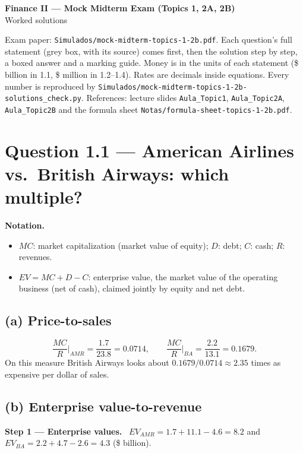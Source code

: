 \documentclass[11pt,a4paper]{article}
\numberwithin{equation}{section}
\newcommand{\statement}[1]{\par\smallskip\noindent\colorbox{black!5}{\parbox{\dimexpr\linewidth-2\fboxsep}{\small #1}}\par\medskip}
\newcommand{\step}[2]{\par\medskip\noindent\textbf{Step #1 --- #2.}~}
\newenvironment{notation}{\par\noindent\textbf{Notation.}\begin{itemize}[leftmargin=1.4em]}{\end{itemize}}
\begin{document}
\begin{center}
  {\Large\bfseries Finance II --- Mock Midterm Exam (Topics 1, 2A, 2B)}\\[4pt]
  {\large Worked solutions}
\end{center}

{\sloppy\noindent Exam paper: \texttt{Simulados/mock-midterm-topics-1-2b.pdf}. Each question's full statement
(grey box, with its source) comes first, then the solution step by step, a boxed answer and a marking
guide. Money is in the units of each statement (\$ billion in 1.1, \$ million in 1.2--1.4). Rates are
decimals inside equations. Every number is reproduced by
\texttt{Simulados/mock-midterm-topics-1-2b-solutions\_check.py}. References: lecture slides
\texttt{Aula\_Topic1}, \texttt{Aula\_Topic2A}, \texttt{Aula\_Topic2B} and the formula sheet
\texttt{Notas/formula-sheet-topics-1-2b.pdf}.\par}

\section{Question 1.1 --- American Airlines vs.\ British Airways: which multiple?}

\statement{\QoneA}

\begin{notation}
  \item $MC$: market capitalization (market value of equity); $D$: debt; $C$: cash; $R$: revenues.
  \item $EV=MC+D-C$: enterprise value, the market value of the operating business (net of cash),
        claimed jointly by equity and net debt.
\end{notation}

\subsection*{(a) Price-to-sales}
\[
  \frac{MC}{R}\Big|_{AMR}=\frac{1.7}{23.8}=0.0714,\qquad
  \frac{MC}{R}\Big|_{BA}=\frac{2.2}{13.1}=0.1679 .
\]
On this measure British Airways looks about $0.1679/0.0714\approx2.35$ times as expensive per dollar of
sales.

\subsection*{(b) Enterprise value-to-revenue}
\step{1}{Enterprise values}
$EV_{AMR}=1.7+11.1-4.6=8.2$ and $EV_{BA}=2.2+4.7-2.6=4.3$ (\$ billion).
\end{document}
